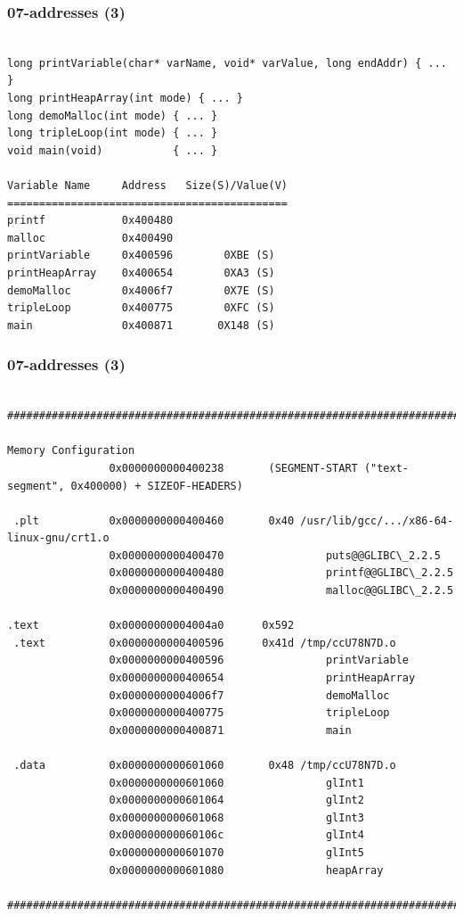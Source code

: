 \documentclass[aspectratio=169, xcolor=table, notheorems, hyperref={pdfpagelabels=false}]{beamer}
\begin{document}
\begin{frame}[fragile]
\frametitle{07-addresses (3)}
\begin{lstlisting}[basicstyle=\ttfamily\footnotesize]

long printVariable(char* varName, void* varValue, long endAddr) { ... }
long printHeapArray(int mode) { ... }
long demoMalloc(int mode) { ... }
long tripleLoop(int mode) { ... }
void main(void)           { ... }

Variable Name     Address   Size(S)/Value(V)
============================================
printf            0x400480
malloc            0x400490
printVariable     0x400596        0XBE (S)
printHeapArray    0x400654        0XA3 (S)
demoMalloc        0x4006f7        0X7E (S)
tripleLoop        0x400775        0XFC (S)
main              0x400871       0X148 (S)

\end{lstlisting}
\end{frame}

\begin{frame}[fragile]
\frametitle{07-addresses (3)}
\begin{lstlisting}[basicstyle=\ttfamily\tiny]

####################################################################################################

Memory Configuration
                0x0000000000400238       (SEGMENT-START ("text-segment", 0x400000) + SIZEOF-HEADERS)

 .plt           0x0000000000400460       0x40 /usr/lib/gcc/.../x86-64-linux-gnu/crt1.o
                0x0000000000400470                puts@@GLIBC\_2.2.5
                0x0000000000400480                printf@@GLIBC\_2.2.5
                0x0000000000400490                malloc@@GLIBC\_2.2.5

.text           0x00000000004004a0      0x592
 .text          0x0000000000400596      0x41d /tmp/ccU78N7D.o
                0x0000000000400596                printVariable
                0x0000000000400654                printHeapArray
                0x00000000004006f7                demoMalloc
                0x0000000000400775                tripleLoop
                0x0000000000400871                main

 .data          0x0000000000601060       0x48 /tmp/ccU78N7D.o
                0x0000000000601060                glInt1
                0x0000000000601064                glInt2
                0x0000000000601068                glInt3
                0x000000000060106c                glInt4
                0x0000000000601070                glInt5
                0x0000000000601080                heapArray

####################################################################################################

\end{lstlisting}
\end{frame}
\end{document}
